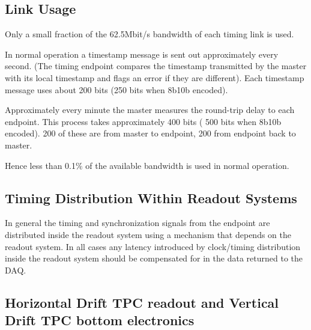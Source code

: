 \documentclass{dune}
\begin{document}

\subsection{Link Usage}

Only a small fraction of the 62.5Mbit/s bandwidth of each timing link is used. 

In normal operation a timestamp message is sent out approximately every second. (The timing endpoint compares the timestamp transmitted by the master with its local timestamp and flags an error if they are different). Each timestamp message uses about 200 bits (250 bits when 8b10b encoded).

Approximately every minute the master measures the round-trip delay to each endpoint. This process takes approximately 400 bits ( 500 bits when 8b10b encoded). 200 of these are from master to endpoint, 200 from endpoint back to master.

Hence less than 0.1\% of the available bandwidth is used in normal operation.

\subsection{Timing Distribution Within Readout Systems}

In general the timing and synchronization signals from the  endpoint are distributed inside the readout system using a mechanism that depends on the readout system. In all cases any latency introduced by clock/timing distribution inside the readout system should be compensated for in the data returned to the DAQ.

\subsection{Horizontal Drift TPC readout and Vertical Drift TPC bottom electronics}
\end{document}
